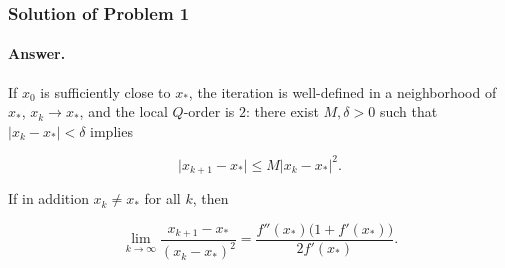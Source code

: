 \documentclass[11pt,a4paper]{article}
\begin{document}
\subsubsection{Solution of Problem 1}

\paragraph{Answer.}
If \(x_{0}\) is sufficiently close to \(x_{*}\), the iteration is well-defined in a neighborhood of \(x_{*}\), \(x_{k}\to x_{*}\), and the local \(Q\)-order is \(2\): there exist \(M,\delta>0\) such that \(|x_{k}-x_{*}|<\delta\) implies

\[
\bigl|x_{k+1}-x_{*}\bigr|
\le
M\bigl|x_{k}-x_{*}\bigr|^{2}.
\]

If in addition \(x_{k}\neq x_{*}\) for all \(k\), then

\[
\lim_{k\to\infty}
\frac{x_{k+1}-x_{*}}{(x_{k}-x_{*})^{2}}
=
\frac{f''(x_{*})\bigl(1+f'(x_{*})\bigr)}{2f'(x_{*})}.
\]
\end{document}
